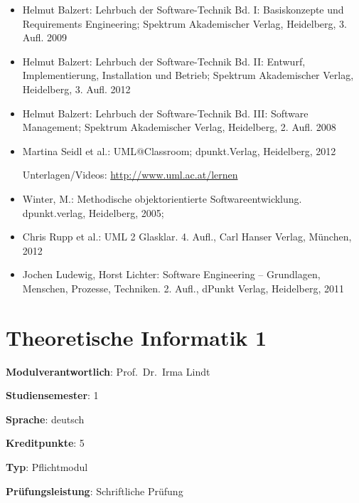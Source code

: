 \begin{itemize}
\tightlist
\item
  Helmut Balzert: Lehrbuch der Software-Technik Bd. I: Basiskonzepte und
  Requirements Engineering; Spektrum Akademischer Verlag, Heidelberg, 3.
  Aufl. 2009
\item
  Helmut Balzert: Lehrbuch der Software-Technik Bd. II: Entwurf,
  Implementierung, Installation und Betrieb; Spektrum Akademischer
  Verlag, Heidelberg, 3. Aufl. 2012
\item
  Helmut Balzert: Lehrbuch der Software-Technik Bd. III: Software
  Management; Spektrum Akademischer Verlag, Heidelberg, 2. Aufl. 2008
\item
  Martina Seidl et al.: UML@Classroom; dpunkt.Verlag, Heidelberg, 2012

  Unterlagen/Videos: \url{http://www.uml.ac.at/lernen}
\item
  Winter, M.: Methodische objektorientierte Softwareentwicklung.
  dpunkt.verlag, Heidelberg, 2005;
\item
  Chris Rupp et al.: UML 2 Glasklar. 4. Aufl., Carl Hanser Verlag,
  München, 2012
\item
  Jochen Ludewig, Horst Lichter: Software Engineering -- Grundlagen,
  Menschen, Prozesse, Techniken. 2. Aufl., dPunkt Verlag, Heidelberg,
  2011
\end{itemize}

\hypertarget{theoretische-informatik-1pathlabelmi-2017modulbeschreibungen-bachelorba_theoretischeinformatik1}{%
\chapter{Theoretische Informatik
1\label{/mi-2017/modulbeschreibungen-bachelor/BA_TheoretischeInformatik1}}\label{theoretische-informatik-1pathlabelmi-2017modulbeschreibungen-bachelorba_theoretischeinformatik1}}

\begin{modulHead}
\textbf{Modulverantwortlich}: Prof.~Dr.~Irma
Lindt
\end{modulHead}
\begin{modulHead}
\textbf{Studiensemester}:
1
\end{modulHead}
\begin{modulHead}
\textbf{Sprache}:
deutsch
\end{modulHead}
\begin{modulHead}
\textbf{Kreditpunkte}:
5
\end{modulHead}
\begin{modulHead}
\textbf{Typ}:
Pflichtmodul
\end{modulHead}
\begin{modulHead}
\textbf{Prüfungsleistung}:
Schriftliche Prüfung
\end{modulHead}


